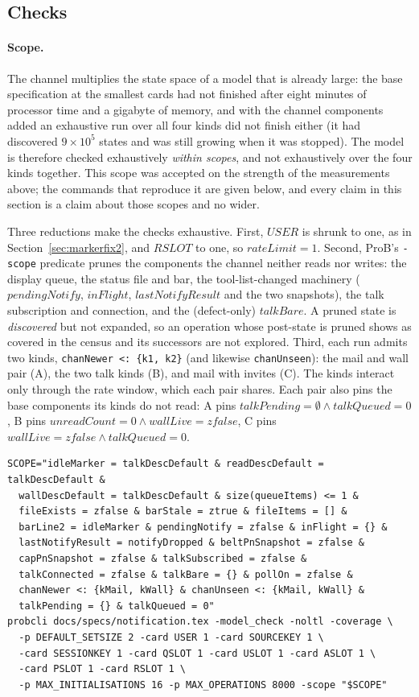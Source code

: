 \documentclass[a4paper,10pt,fleqn]{article}
\begin{document}
\subsection{Checks}
\label{sec:chanchecks}

\paragraph{Scope.}  The channel multiplies the state space of a model that
is already large: the base specification at the smallest cards had not
finished after eight minutes of processor time and a gigabyte of memory,
and with the channel components added an exhaustive run over all four kinds
did not finish either (it had discovered $9 \times 10^5$ states and was
still growing when it was stopped).  The model is therefore checked
exhaustively \emph{within scopes}, and not exhaustively over the four kinds
together.  This scope was accepted on the strength of the measurements above;
the commands that reproduce it are given below, and every claim in this
section is a claim about those scopes and no wider.

Three reductions make the checks exhaustive.  First, $USER$ is shrunk to one,
as in Section~\ref{sec:markerfix2}, and $RSLOT$ to one, so $rateLimit = 1$.
Second, ProB's \texttt{-scope} predicate prunes the components the channel
neither reads nor writes: the display queue, the status file and bar, the
tool-list-changed machinery ($pendingNotify$, $inFlight$,
$lastNotifyResult$ and the two snapshots), the talk subscription and
connection, and the (defect-only) $talkBare$.  A pruned state is
\emph{discovered} but not expanded, so an operation whose post-state is
pruned shows as covered in the census and its successors are not explored.
Third, each run admits two kinds, \texttt{chanNewer <: \{k1, k2\}} (and
likewise \texttt{chanUnseen}): the mail and wall pair (A), the two talk kinds
(B), and mail with invites (C).  The kinds interact only through the rate
window, which each pair shares.  Each pair also pins the base components its
kinds do not read: A pins $talkPending = \emptyset \land talkQueued = 0$, B
pins $unreadCount = 0 \land wallLive = zfalse$, C pins $wallLive = zfalse
\land talkQueued = 0$.

\begin{verbatim}
SCOPE="idleMarker = talkDescDefault & readDescDefault = talkDescDefault &
  wallDescDefault = talkDescDefault & size(queueItems) <= 1 &
  fileExists = zfalse & barStale = ztrue & fileItems = [] &
  barLine2 = idleMarker & pendingNotify = zfalse & inFlight = {} &
  lastNotifyResult = notifyDropped & beltPnSnapshot = zfalse &
  capPnSnapshot = zfalse & talkSubscribed = zfalse &
  talkConnected = zfalse & talkBare = {} & pollOn = zfalse &
  chanNewer <: {kMail, kWall} & chanUnseen <: {kMail, kWall} &
  talkPending = {} & talkQueued = 0"
probcli docs/specs/notification.tex -model_check -noltl -coverage \
  -p DEFAULT_SETSIZE 2 -card USER 1 -card SOURCEKEY 1 \
  -card SESSIONKEY 1 -card QSLOT 1 -card USLOT 1 -card ASLOT 1 \
  -card PSLOT 1 -card RSLOT 1 \
  -p MAX_INITIALISATIONS 16 -p MAX_OPERATIONS 8000 -scope "$SCOPE"
\end{verbatim}
\end{document}
